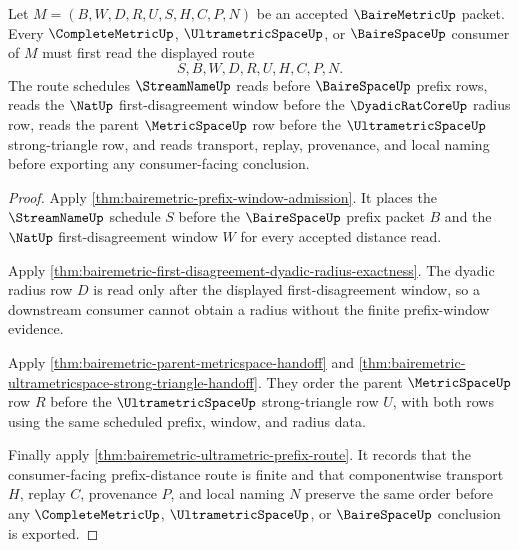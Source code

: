\begin{theorem}
\label{thm:bairemetric-complete-ultrametric-consumer-readiness}
Let $M=(B,W,D,R,U,S,H,C,P,N)$ be an accepted $\BaireMetricUp$ packet. Every $\CompleteMetricUp$, $\UltrametricSpaceUp$, or $\BaireSpaceUp$ consumer of $M$ must first read the displayed route
$$
S,B,W,D,R,U,H,C,P,N .
$$
The route schedules $\StreamNameUp$ reads before $\BaireSpaceUp$ prefix rows, reads the $\NatUp$ first-disagreement window before the $\DyadicRatCoreUp$ radius row, reads the parent $\MetricSpaceUp$ row before the $\UltrametricSpaceUp$ strong-triangle row, and reads transport, replay, provenance, and local naming before exporting any consumer-facing conclusion.
\end{theorem}
\begin{proof}
Apply \autoref{thm:bairemetric-prefix-window-admission}. It places the $\StreamNameUp$ schedule $S$ before the $\BaireSpaceUp$ prefix packet $B$ and the $\NatUp$ first-disagreement window $W$ for every accepted distance read.

Apply \autoref{thm:bairemetric-first-disagreement-dyadic-radius-exactness}. The dyadic radius row $D$ is read only after the displayed first-disagreement window, so a downstream consumer cannot obtain a radius without the finite prefix-window evidence.

Apply \autoref{thm:bairemetric-parent-metricspace-handoff} and \autoref{thm:bairemetric-ultrametricspace-strong-triangle-handoff}. They order the parent $\MetricSpaceUp$ row $R$ before the $\UltrametricSpaceUp$ strong-triangle row $U$, with both rows using the same scheduled prefix, window, and radius data.

Finally apply \autoref{thm:bairemetric-ultrametric-prefix-route}. It records that the consumer-facing prefix-distance route is finite and that componentwise transport $H$, replay $C$, provenance $P$, and local naming $N$ preserve the same order before any $\CompleteMetricUp$, $\UltrametricSpaceUp$, or $\BaireSpaceUp$ conclusion is exported.
\end{proof}

